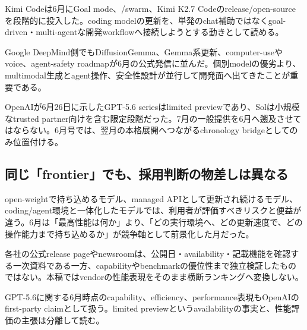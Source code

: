 Kimi Codeは6月にGoal mode、/swarm、Kimi K2.7 Codeのrelease/open-sourceを段階的に投入した。coding modelの更新を、単発のchat補助ではなくgoal-driven・multi-agentな開発workflowへ接続しようとする動きとして読める。\autocite{src-9191d43918fc}


Google DeepMind側でもDiffusionGemma、Gemma系更新、computer-useやvoice、agent-safety roadmapが6月の公式発信に並んだ。個別modelの優劣より、multimodal生成とagent操作、安全性設計が並行して開発面へ出てきたことが重要である。\autocite{src-dd5d9b8662f3}


\begin{claimboundary}
OpenAIが6月26日に示したGPT-5.6 seriesはlimited previewであり、Solは小規模なtrusted partner向けを含む限定段階だった。7月の一般提供を6月へ遡及させてはならない。6月号では、翌月の本格展開へつながるchronology bridgeとしてのみ位置付ける。\autocite{src-30f48121decc}
\end{claimboundary}

\subsection{同じ「frontier」でも、採用判断の物差しは異なる}

open-weightで持ち込めるモデル、managed APIとして更新され続けるモデル、coding/agent環境と一体化したモデルでは、利用者が評価すべきリスクと便益が違う。6月は「最高性能は何か」より、「どの実行環境へ、どの更新速度で、どの操作能力まで持ち込めるか」が競争軸として前景化した月だった。\autocite{src-9191d43918fc,src-a24fd97eb3d0,src-d8e13386974c,src-dd5d9b8662f3,src-eac8dfbeb78c}


\begin{claimboundary}
各社の公式release pageやnewsroomは、公開日・availability・記載機能を確認する一次資料である一方、capabilityやbenchmarkの優位性まで独立検証したものではない。本稿ではvendorの性能表現をそのまま横断ランキングへ変換しない。\autocite{src-9191d43918fc,src-a24fd97eb3d0,src-d8e13386974c,src-dd5d9b8662f3,src-eac8dfbeb78c,src-f6aa679babd7}
\end{claimboundary}

\begin{claimboundary}
GPT-5.6に関する6月時点のcapability、efficiency、performance表現もOpenAIのfirst-party claimとして扱う。limited previewというavailabilityの事実と、性能評価の主張は分離して読む。\autocite{src-30f48121decc}
\end{claimboundary}
